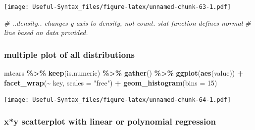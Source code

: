 \documentclass[
]{article}
\newenvironment{Shaded}{\begin{snugshade}}{\end{snugshade}}
\newcommand{\AttributeTok}[1]{\textcolor[rgb]{0.13,0.29,0.53}{#1}}
\newcommand{\CommentTok}[1]{\textcolor[rgb]{0.56,0.35,0.01}{\textit{#1}}}
\newcommand{\DecValTok}[1]{\textcolor[rgb]{0.00,0.00,0.81}{#1}}
\newcommand{\FunctionTok}[1]{\textcolor[rgb]{0.13,0.29,0.53}{\textbf{#1}}}
\newcommand{\NormalTok}[1]{#1}
\newcommand{\SpecialCharTok}[1]{\textcolor[rgb]{0.81,0.36,0.00}{\textbf{#1}}}
\newcommand{\StringTok}[1]{\textcolor[rgb]{0.31,0.60,0.02}{#1}}
\begin{document}
\texttt{[image: Useful-Syntax\_files/figure-latex/unnamed-chunk-63-1.pdf]}

\begin{Shaded}
\begin{Highlighting}[]
\CommentTok{\# ..density.. changes y axis to density, not count. stat function defines normal}
\CommentTok{\# line based on data provided.}
\end{Highlighting}
\end{Shaded}

\hypertarget{multiple-plot-of-all-distributions}{%
\subsubsection{multiple plot of all distributions}\label{multiple-plot-of-all-distributions}}

\begin{Shaded}
\begin{Highlighting}[]
\NormalTok{mtcars }\SpecialCharTok{\%\textgreater{}\%} \FunctionTok{keep}\NormalTok{(is.numeric) }\SpecialCharTok{\%\textgreater{}\%} \FunctionTok{gather}\NormalTok{() }\SpecialCharTok{\%\textgreater{}\%} \FunctionTok{ggplot}\NormalTok{(}\FunctionTok{aes}\NormalTok{(value)) }\SpecialCharTok{+}
  \FunctionTok{facet\_wrap}\NormalTok{(}\SpecialCharTok{\textasciitilde{}}\NormalTok{ key, }\AttributeTok{scales =} \StringTok{"free"}\NormalTok{) }\SpecialCharTok{+} \FunctionTok{geom\_histogram}\NormalTok{(}\AttributeTok{bins =} \DecValTok{15}\NormalTok{)}
\end{Highlighting}
\end{Shaded}

\texttt{[image: Useful-Syntax\_files/figure-latex/unnamed-chunk-64-1.pdf]}

\hypertarget{xy-scatterplot-with-linear-or-polynomial-regression}{%
\subsubsection{x*y scatterplot with linear or polynomial regression}\label{xy-scatterplot-with-linear-or-polynomial-regression}}
\end{document}
